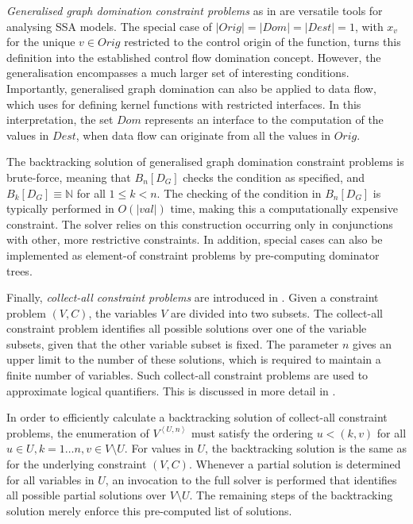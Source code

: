    {\it Generalised graph domination constraint problems} as in
     are versatile tools for analysing SSA models.
    The special case of $|Orig|=|Dom|=|Dest|=1$, with $x_v$ for the unique
    $v\in Orig$ restricted to the control origin of the function, turns this
    definition into the established control flow domination concept.
    However, the generalisation encompasses a much larger set of interesting
    conditions.
    Importantly, generalised graph domination can also be applied to data flow,
    which  uses for defining kernel functions with
    restricted interfaces.
    In this interpretation, the set $Dom$ represents an interface to the
    computation of the values in $Dest$, when data flow can originate from all
    the values in $Orig$.

    The backtracking solution of generalised graph domination constraint
    problems is brute-force, meaning that $B_n[D_G]$ checks the condition
    as specified, and $B_k[D_G]\equiv\mathbb N$ for all $1\leq k<n$.
    The checking of the condition in $B_n[D_G]$ is typically performed in
    $O(|val|)$ time, making this a computationally expensive constraint.
    The solver relies on this construction occurring only in conjunctions with
    other, more restrictive constraints.
    In addition, special cases can also be implemented as element-of constraint
    problems by pre-computing dominator trees.

    Finally, {\it collect-all constraint problems} are introduced in
    .
    Given a constraint problem $(V,C)$, the variables $V$ are divided into
    two subsets.
    The collect-all constraint problem identifies all possible solutions over
    one of the variable subsets, given that the other variable subset is fixed.
    The parameter $n$ gives an upper limit to the number of these solutions,
    which is required to maintain a finite number of variables.
    Such collect-all constraint problems are used to approximate logical
    quantifiers.
    This is discussed in more detail in .

    In order to efficiently calculate a backtracking solution of collect-all
    constraint problems, the enumeration of $V^{\left<U,n\right>}$ must satisfy
    the ordering $u<(k,v)$ for all $u\in U,k=1\dots n,v\in V\setminus U$.
    For values in $U$, the backtracking solution is the same as for the
    underlying constraint $(V,C)$.
    Whenever a partial solution is determined for all variables in $U$, an
    invocation to the full solver is performed that identifies all possible
    partial solutions over $V\setminus U$.
    The remaining steps of the backtracking solution merely enforce this
    pre-computed list of solutions.

